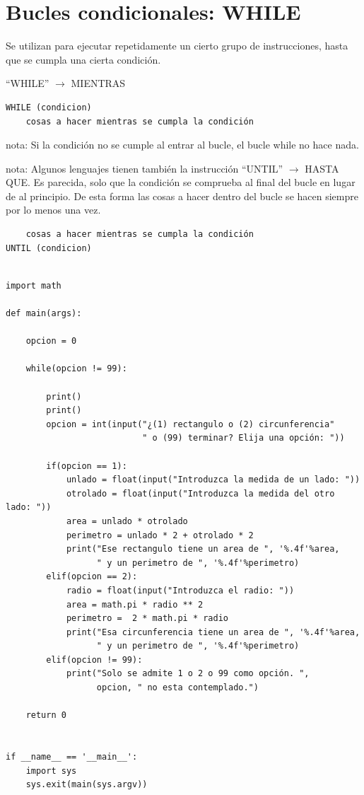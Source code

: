 \documentclass[spanish,12pt,a4paper,final,oneside]{book}
\begin{document}
\section{Bucles condicionales: WHILE}
Se utilizan para ejecutar repetidamente un cierto grupo de instrucciones, hasta que se cumpla una cierta condición.

``WHILE'' $\rightarrow$ MIENTRAS
\begin{lstlisting}
WHILE (condicion)
    cosas a hacer mientras se cumpla la condición
\end{lstlisting}
nota: Si la condición no se cumple al entrar al bucle, el bucle while no hace nada.

nota: Algunos lenguajes  tienen también la instrucción ``UNTIL'' $\rightarrow$ HASTA QUE. Es parecida, solo que la condición se comprueba al final del bucle en lugar de al principio. De esta forma las cosas a hacer dentro del bucle se hacen siempre por lo menos una vez.
\begin{lstlisting}
    cosas a hacer mientras se cumpla la condición
UNTIL (condicion)
\end{lstlisting}


\begin{lstlisting}[frame=single, caption=lenguaje python]

import math

def main(args):
    
    opcion = 0
    
    while(opcion != 99):
    
        print()
        print()
        opcion = int(input("¿(1) rectangulo o (2) circunferencia"
                           " o (99) terminar? Elija una opción: "))
            
        if(opcion == 1):
            unlado = float(input("Introduzca la medida de un lado: "))
            otrolado = float(input("Introduzca la medida del otro lado: "))   
            area = unlado * otrolado
            perimetro = unlado * 2 + otrolado * 2
            print("Ese rectangulo tiene un area de ", '%.4f'%area,
                  " y un perimetro de ", '%.4f'%perimetro)
        elif(opcion == 2):
            radio = float(input("Introduzca el radio: "))
            area = math.pi * radio ** 2
            perimetro =  2 * math.pi * radio 
            print("Esa circunferencia tiene un area de ", '%.4f'%area,
                  " y un perimetro de ", '%.4f'%perimetro)
        elif(opcion != 99):
            print("Solo se admite 1 o 2 o 99 como opción. ",
                  opcion, " no esta contemplado.")
    
    return 0


if __name__ == '__main__':
    import sys
    sys.exit(main(sys.argv))
\end{lstlisting}
\end{document}
